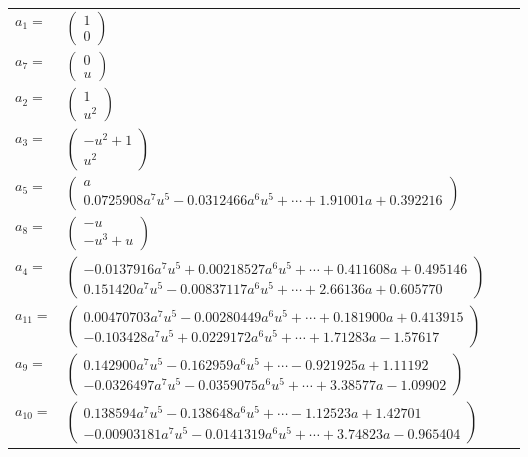 \documentclass[1p]{elsarticle_modified}
\theoremstyle{definition}
\begin{document}
\begin{tabular}{m{7pt} m{180pt} m{7pt} m{180pt} }
\flushright $a_{1}=$&$\begin{pmatrix}1\\0\end{pmatrix}$ \\
\flushright $a_{7}=$&$\begin{pmatrix}0\\u\end{pmatrix}$ \\
\flushright $a_{2}=$&$\begin{pmatrix}1\\u^2\end{pmatrix}$ \\
\flushright $a_{3}=$&$\begin{pmatrix}- u^2+1\\u^2\end{pmatrix}$ \\
\flushright $a_{5}=$&$\begin{pmatrix}a\\0.0725908 a^{7} u^{5}-0.0312466 a^{6} u^{5}+\cdots+1.91001 a+0.392216\end{pmatrix}$ \\
\flushright $a_{8}=$&$\begin{pmatrix}- u\\- u^3+u\end{pmatrix}$ \\
\flushright $a_{4}=$&$\begin{pmatrix}-0.0137916 a^{7} u^{5}+0.00218527 a^{6} u^{5}+\cdots+0.411608 a+0.495146\\0.151420 a^{7} u^{5}-0.00837117 a^{6} u^{5}+\cdots+2.66136 a+0.605770\end{pmatrix}$ \\
\flushright $a_{11}=$&$\begin{pmatrix}0.00470703 a^{7} u^{5}-0.00280449 a^{6} u^{5}+\cdots+0.181900 a+0.413915\\-0.103428 a^{7} u^{5}+0.0229172 a^{6} u^{5}+\cdots+1.71283 a-1.57617\end{pmatrix}$ \\
\flushright $a_{9}=$&$\begin{pmatrix}0.142900 a^{7} u^{5}-0.162959 a^{6} u^{5}+\cdots-0.921925 a+1.11192\\-0.0326497 a^{7} u^{5}-0.0359075 a^{6} u^{5}+\cdots+3.38577 a-1.09902\end{pmatrix}$ \\
\flushright $a_{10}=$&$\begin{pmatrix}0.138594 a^{7} u^{5}-0.138648 a^{6} u^{5}+\cdots-1.12523 a+1.42701\\-0.00903181 a^{7} u^{5}-0.0141319 a^{6} u^{5}+\cdots+3.74823 a-0.965404\end{pmatrix}$ \\

\end{tabular}
\end{document}
